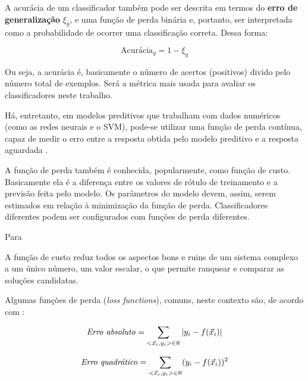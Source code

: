 A acurácia de um classificador também pode ser descrita em termos do \textbf{erro de generalização} $\xi_g$, e uma função de perda binária e, portanto, ser interpretada como a probabilidade de ocorrer uma classificação correta. Dessa forma:

\begin{equation}
\textrm{Acurácia}_g=1 - \xi_g
\end{equation}

Ou seja, a acurácia é, basicamente o número de acertos (positivos) divido pelo número total de exemplos. Será a métrica mais usada para avaliar os classificadores neste trabalho.

Há, entretanto, em modelos preditivos que trabalham com dados numéricos (como as redes neurais e o SVM), pode-se utilizar uma função de perda contínua, capaz de medir o erro entre a resposta obtida pelo modelo preditivo e a resposta aguardada \cite{Boscarioli2017} \cite{deep_learning_book_2019}.

A função de perda também é conhecida, popularmente, como função de custo. Basicamente ela é a diferença entre os valores de rótulo de treinamento e a previsão feita pelo modelo. Os parâmetros do modelo devem, assim, serem estimados em relação à minimização da função de perda. Classificadores diferentes podem ser configurados com funções de perda diferentes.  \cite{nn_smithing_1999} \cite{minewiskan_modelos_nodate} \cite{silva_redes_2016} \cite{Boscarioli2017} \cite{goldschmidt2005} \cite{geron_maos_2020} \cite{deep_learning_book_2019}

Para 
\begin{citacao}
	A função de custo reduz todos os aspectos bons e ruins de um sistema complexo a um único número, um valor escalar, o que permite ranquear e comparar as soluções candidatas.
\end{citacao}

Algumas funções de perda (\textit{loss functions}), comuns, neste contexto são, de acordo com :

\begin{equation}\label{erro_absoluto}
	\textrm{\textit{Erro absoluto}}=\sum_{<\vec{x}_i, y_i> \in \aleph} |y_i - f(\vec{x}_i)|
\end{equation}

\begin{equation}\label{erro_quadratico}
\textrm{\textit{Erro quadrático}}=\sum_{<\vec{x}_i, y_i> \in \aleph} (y_i - f(\vec{x}_i))^2
\end{equation}

